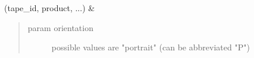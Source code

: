 \documentclass[letterpaper,10pt,english]{sphinxmanual}
\begin{document}
\begin{fulllineitems}
\begin{savenotes}
\begin{longtable}[c]{}
\endfirsthead

%
{}\\
\hline

\endhead

\hline
{}\\
\endfoot

\endlastfoot

\sphinxAtStartPar
{\hyperref[\detokenize{generated/quality_assessment.quality_pdf_report.DefectReportPDF.__init__:quality_assessment.quality_pdf_report.DefectReportPDF.__init__}]{}}(tape\_id, product, ...)
&
\sphinxAtStartPar
\begin{quote}\begin{description}
\item[{param orientation}] \leavevmode
\sphinxAtStartPar
possible values are "portrait" (can be abbreviated "P")

\end{description}\end{quote}


\end{longtable}
\end{savenotes}
\end{fulllineitems}
\end{document}
